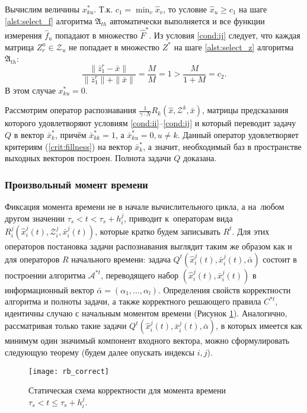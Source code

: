 \begin{Proof}
 Вычислим величины $x_{ku}^*$. Т.к. $c_1=\min_v\hat x_v$, то условие $\hat x_u\geqslant c_1$ на шаге \ref{alst:select_f} алгоритма $\mathfrak{A}_{th}$ автоматически выполняется и все функции измерения $\hat f_u$ попадают в множество $\hat F^*$. Из условия \ref{cond:ij} следует, что каждая матрица $Z_r^u\in\mathcal Z_u$ не попадает в множество $Z^*$ на шаге \ref{alst:select_z} алгоритма $\mathfrak A_{th}$:
 \[
 \frac{\|\bar{z}_1^r-\bar{x}\|}{\|\bar{z}_1^r\|+\|\bar{x}\|}=\frac{M}{M}=1>\frac{M}{1+M}=c_2.
 \]
 В этом случае $x_{ku}^*=0$.
 
 Рассмотрим оператор распознавания $\frac{1}{\gamma\cdot N}R_k(\hat x,\mathcal Z^k,\bar x)$, матрицы предсказания которого удовлетворяют условиям \ref{cond:ii}--\ref{cond:ij} и который переводит задачу $Q$ в вектор $\bar x_k^*$, причём $\bar x_{kk}^*=1$, а $\bar x_{ku}^*=0, u\neq k$. Данный оператор удовлетворяет критериям (\ref{crit:fillness}) на вектор $\bar x_k^*$, а значит, необходимый баз в пространстве выходных векторов построен. Полнота задачи $Q$ доказана.
\end{Proof}

\subsubsection{Произвольный момент времени}
Фиксация момента времени не в начале вычислительного цикла, а на~любом другом значении $\tau_s<t<\tau_s+h_i^j$, приводит к~операторам вида $R_i^j(\hat{x}_i^j(t), \mathcal{Z}_i^j, \bar{x}_i^j(t))$, которые кратко будем записывать $R^t$. Для этих операторов постановка задачи распознавания выглядит таким же образом как и для операторов $R$ начального времени: задача $Q^t(\hat{x}_i^j(t), \bar{x}_i^j(t), \bar\alpha)$ состоит в построении алгоритма $\mathcal A^{*t}$, переводящего набор $(\hat{x}_i^j(t), \bar{x}_i^j(t))$ в информационный вектор $\bar\alpha=(\alpha_1,\dots,\alpha_l)$. Определения свойств корректности алгоритма и полноты задачи, а также корректного решающего правила $C^{*t}$, идентичны случаю с начальным моментом времени (Рисунок \ref{fig:rb_correct_statt}). Аналогично, рассматривая только такие задачи $Q^t(\hat{x}_i^j(t), \bar{x}_i^j(t), \bar\alpha)$, в которых имеется как минимум один значимый компонент входного вектора, можно сформулировать следующую теорему (будем далее опускать индексы $i,j$).
	
\begin{figure}[h]
	\centering
	\texttt{[image: rb\_correct]}
	\caption{Статическая схема корректности для момента времени $\tau_s<t\leqslant\tau_s+h_i^j$.}
	\label{fig:rb_correct_statt}
\end{figure}
	

